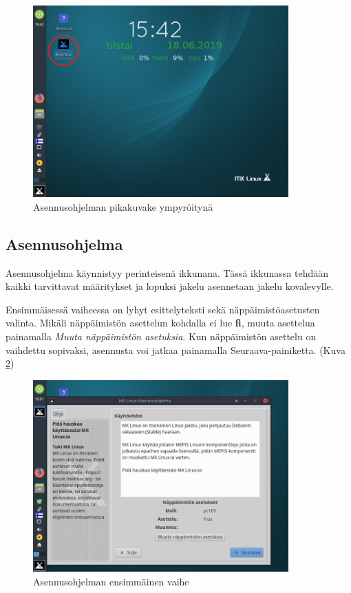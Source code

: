 \documentclass[a4paper, 12pt, finnish]{article}
\begin{document}
\begin{figure}[htpb]
    \begin{center}
        \includegraphics[width=0.875\textwidth]{asen/asenna}
        \caption{Asennusohjelman pikakuvake ympyröitynä}
        \label{fig:asenna}
    \end{center}
\end{figure}

\subsection{Asennusohjelma}

Asennusohjelma käynnistyy perinteisenä ikkunana. Tässä ikkunassa tehdään kaikki tarvittavat määritykset ja lopuksi jakelu asennetaan jakelu kovalevylle.

Ensimmäisessä vaiheessa on lyhyt esittelyteksti sekä näppäimistöasetusten valinta. Mikäli näppäimistön asettelun kohdalla ei lue \textbf{fi}, muuta asettelua painamalla \textit{Muuta näppäimistön asetuksia}. Kun näppäimistön asettelu on vaihdettu sopivaksi, asennusta voi jatkaa painamalla Seuraava-painiketta. (Kuva \ref{fig:as1})

\begin{figure}[htpb]
    \begin{center}
        \includegraphics[width=0.875\textwidth]{asen/asennusohjelma1}
        \caption{Asennusohjelman ensimmäinen vaihe}
        \label{fig:as1}
    \end{center}
\end{figure}
\clearpage
\end{document}

